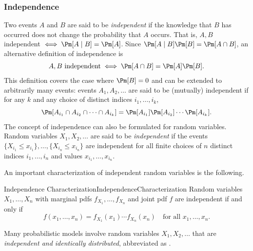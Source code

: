 \subsubsection{Independence}
Two events \(A\) and \(B\) are said to be \textit{independent} if the knowledge that \(B\) has occurred does not change the probability that \(A\) occurs. That is, \(A, B\) independent \(\iff \Pm[A \mid B] = \Pm[A]\). Since \(\Pm[A \mid B] \Pm[B] = \Pm[A \cap B]\), an alternative definition of independence is
\begin{equation*}
	A, B \text{ independent} \iff \Pm[A \cap B] = \Pm[A]\Pm[B].
\end{equation*}
This definition covers the case where \(\Pm[B] = 0\) and can be extended to arbitrarily many events: events \(A_1, A_2, \dots\) are said to be (mutually) independent if for any \(k\) and any choice of distinct indices \(i_1, \dots, i_k\),
\begin{equation*}
	\Pm[A_{i_1} \cap A_{i_2} \cap \dots \cap A_{i_k}] = \Pm[A_{i_1}] \Pm[A_{i_2}] \cdots \Pm[A_{i_k}].
\end{equation*}
The concept of independence can also be formulated for random variables. Random variables \(X_1, X_2, \dots\) are said to be \textit{independent} if the events \(\{X_{i_1} \le x_{i_1}\}, \dots, \{X_{i_n} \le x_{i_n}\}\) are independent for all finite choices of \(n\) distinct indices \(i_1, \dots, i_n\) and values \(x_{i_1}, \dots, x_{i_n}\).

An important characterization of independent random variables is the following.

\begin{thm}{Independence Characterization}{IndependenceCharacterization}
	Random variables \(X_1, \dots, X_n\) with marginal pdfs \(f_{X_1}, \dots, f_{X_n}\) and joint pdf \(f\) are independent if and only if
	\begin{equation}
		f(x_1, \dots, x_n) = f_{X_1}(x_1) \cdots f_{X_n}(x_n) \quad \text{for all } x_1, \dots, x_n. \label{eq:IndependencePDF}
	\end{equation}
\end{thm}

Many probabilistic models involve random variables \(X_1, X_2, \dots\) that are \textit{independent and identically distributed}, abbreviated as \iid.

